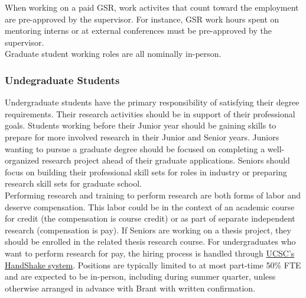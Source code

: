 \noindent
When working on a paid GSR, work activites that count toward the employment are pre-approved by the supervisor. For instance, GSR work hours spent on mentoring interns or at external conferences
must be pre-approved by the supervisor.\\

\noindent
Graduate student working roles are all nominally in-person.

\subsubsection{Undegraduate Students}

Undergraduate students have the primary responsibility
of satisfying their degree requirements. Their research
activities should be in support of their professional goals.
Students working before their Junior year should be gaining
skills to prepare for more involved research in their
Junior and Senior years. Juniors wanting to pursue a 
graduate degree should be focused on 
completing a well-organized research project ahead of their
graduate applications. Seniors should focus on building their
professional skill sets for roles in industry or preparing
research skill sets for graduate school. \\

\noindent
Performing research and training to perform research are both
forms of labor and deserve compensation.  This labor could be
in the context of an academic course for credit (the compensation
is course credit) or as part of separate independent research (compensation
is pay). If Seniors are working
on a thesis project, they should be enrolled in the
related thesis research course. For undergraduates who
want to perform research for pay, the 
hiring process is handled through \href{https://careers.ucsc.edu/student/handshake-student-resources/index.html}{UCSC's HandShake system}. Positions are typically limited
to at most part-time 50\% FTE and are expected to be in-person,
including during summer quarter, unless otherwise arranged in advance
with Brant with written confirmation.




